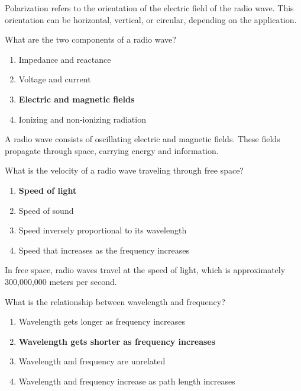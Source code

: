 Polarization refers to the orientation of the electric field of the radio wave. This orientation can be horizontal, vertical, or circular, depending on the application.

\begin{tcolorbox}[colback=gray!10!white,colframe=black!75!black,title={T3B03}]
What are the two components of a radio wave?
\begin{enumerate}[label=\Alph*),noitemsep]
    \item Impedance and reactance
    \item Voltage and current
    \item \textbf{Electric and magnetic fields}
    \item Ionizing and non-ionizing radiation
\end{enumerate}
\end{tcolorbox}

A radio wave consists of oscillating electric and magnetic fields. These fields propagate through space, carrying energy and information.

\begin{tcolorbox}[colback=gray!10!white,colframe=black!75!black,title={T3B04}]
What is the velocity of a radio wave traveling through free space?
\begin{enumerate}[label=\Alph*),noitemsep]
    \item \textbf{Speed of light}
    \item Speed of sound
    \item Speed inversely proportional to its wavelength
    \item Speed that increases as the frequency increases
\end{enumerate}
\end{tcolorbox}

In free space, radio waves travel at the speed of light, which is approximately 300,000,000 meters per second.

\begin{tcolorbox}[colback=gray!10!white,colframe=black!75!black,title={T3B05}]
What is the relationship between wavelength and frequency?
\begin{enumerate}[label=\Alph*),noitemsep]
    \item Wavelength gets longer as frequency increases
    \item \textbf{Wavelength gets shorter as frequency increases}
    \item Wavelength and frequency are unrelated
    \item Wavelength and frequency increase as path length increases
\end{enumerate}
\end{tcolorbox}

